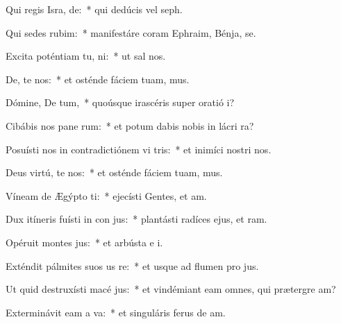 \item Qui regis Isra, de:~* qui dedúcis vel  seph.
\item Qui sedes  rubim:~* manifestáre coram Ephraim, Bénja,  se.
\item Excita poténtiam tu,  ni:~* ut sal  nos.
\item De, te nos:~* et osténde fáciem tuam,   mus.
\item Dómine, De tum,~* quoúsque irascéris super oratió  i?
\item Cibábis nos pane rum:~* et potum dabis nobis in lácri  ra?
\item Posuísti nos in contradictiónem vi tris:~* et inimíci nostri  nos.
\item Deus virtú, te nos:~* et osténde fáciem tuam,   mus.
\item Víneam de Ægýpto ti:~* ejecísti Gentes, et  am.
\item Dux itíneris fuísti in con jus:~* plantásti radíces ejus, et  ram.
\item Opéruit montes  jus:~* et arbústa e  i.
\item Exténdit pálmites suos us  re:~* et usque ad flumen pro jus.
\item Ut quid destruxísti macé jus:~* et vindémiant eam omnes, qui prætergre am?
\item Exterminávit eam a  va:~* et singuláris ferus de  am.
